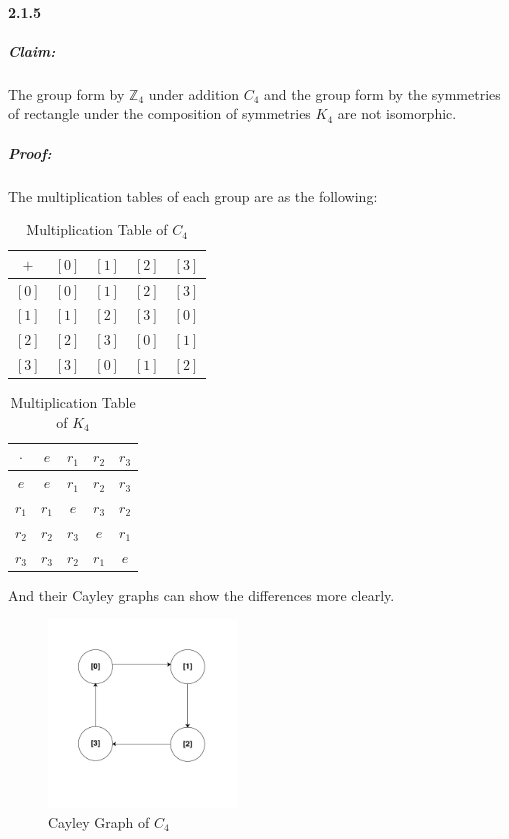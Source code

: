\documentclass[11pt]{article}
\begin{document}
\paragraph{2.1.5}
	\subparagraph{Claim:}The group form by $\mathbb{Z}_4$ under addition $C_4$ and the group form by the symmetries of rectangle under the composition of symmetries $K_4$ are not isomorphic.
	\subparagraph{Proof:}
		The multiplication tables of each group are as the following:
		\begin{table}[!hbp]
			\centering
			\begin{tabular}{c || c | c | c | c }
			 $+$ & $[0]$ & $[1]$ & $[2]$ & $[3]$\\
			 \hline
			 $[0]$ & $[0]$ & $[1]$ & $[2]$ & $[3]$\\
			 \hline
			 $[1]$ & $[1]$ & $[2]$ & $[3]$ & $[0]$\\
			 \hline
			 $[2]$ & $[2]$ & $[3]$ & $[0]$ & $[1]$\\
			 \hline
			 $[3]$ & $[3]$ & $[0]$ & $[1]$ & $[2]$\\
			 \hline
			\end{tabular}
			\caption{Multiplication Table of $C_4$}
		\end{table} 
		\begin{table}[!hbp]
			\centering
			\begin{tabular}{c || c | c | c | c }
			 $\cdot$ & $e$ & $r_1$ & $r_2$ & $r_3$\\
			 \hline
			 $e$ & $e$ & $r_1$ & $r_2$ & $r_3$\\
			 \hline
			 $r_1$ & $r_1$ & $e$ & $r_3$ & $r_2$\\
			 \hline
			 $r_2$ & $r_2$ & $r_3$ & $e$ & $r_1$\\
			 \hline
			 $r_3$ & $r_3$ & $r_2$ & $r_1$ & $e$\\
			 \hline
			\end{tabular}
			\caption{Multiplication Table of $K_4$}
		\end{table}
		
		And their Cayley graphs can show the differences more clearly.
		
	\begin{figure}[H]
        \begin{center}
        \includegraphics[width=5cm]{./imgs/C_4.png}
        \caption{Cayley Graph of $C_4$}
        \end{center}
    \end{figure}
    
\end{document}
